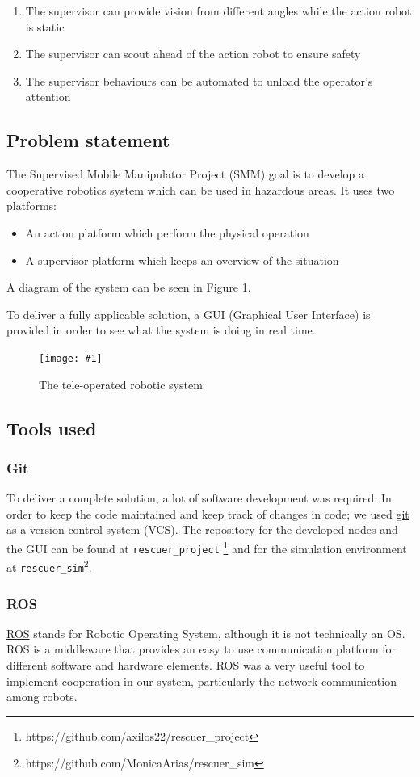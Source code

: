 \documentclass[11pt,a4paper]{article}
\newcommand{\centerFigure}[2]{
\begin{figure}[ht]	
\centering
\texttt{[image: \#1]}
\caption{#2}
\end{figure}
}
\begin{document}
\begin{enumerate}
\item The supervisor can provide vision from different angles while the action robot is static
\item The supervisor can scout ahead of the action robot to ensure safety
\item The supervisor behaviours can be automated to unload the operator's attention
\end{enumerate}


\subsection{Problem statement}
The Supervised Mobile Manipulator Project (SMM) goal is to develop a cooperative robotics
system which can be used in hazardous areas. It uses two platforms: 

\begin{itemize}
\item An action platform which perform the physical operation
\item A supervisor platform which keeps an overview of the situation
\end{itemize}

A diagram of the system can be seen in Figure 1.

To deliver a fully applicable solution, a GUI (Graphical User Interface) is provided in
order to see what the system is doing in real time.

\centerFigure{teleopSystem.png}{The tele-operated robotic system}


\subsection{Tools used}
\subsubsection{Git}
To deliver a complete solution, a lot of software development was required. In order to keep
the code maintained and keep track of changes in code; we used \href{https://git-scm.com/}{git} as a version control system
 (VCS). The repository for the developed nodes and the GUI can be found at \verb!rescuer_project!  \footnote{https://github.com/axilos22/rescuer\_project} and for the simulation environment at \verb!rescuer_sim!\footnote{https://github.com/MonicaArias/rescuer\_sim}.

\subsubsection{ROS}
\href{http://www.ros.org}{ROS} stands for Robotic Operating System, although it is not technically an OS. ROS is a middleware that provides an easy to use communication platform for different software and hardware elements. ROS was a very useful tool to implement cooperation in our system, particularly the network communication among robots.
\end{document}
